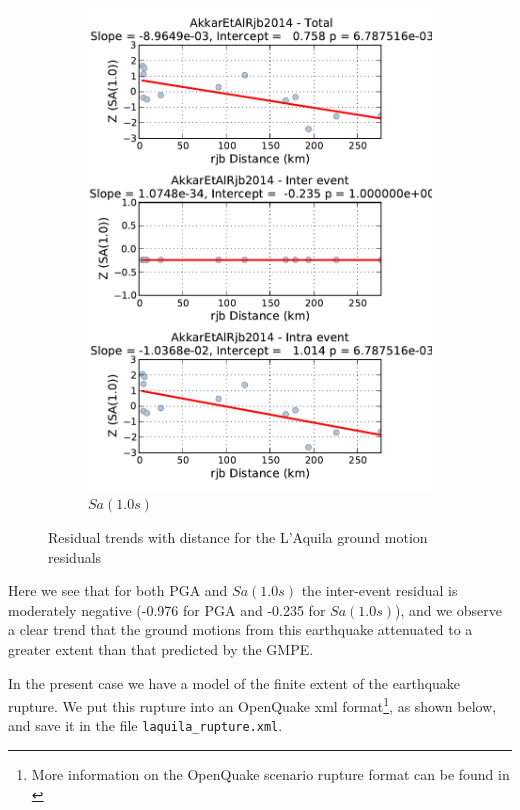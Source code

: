 \begin{figure}[htb]
\begin{subfigure}[b]{0.49\textwidth}
      \includegraphics[width=\textwidth]{./figures/hazard/LAquila_Residuals_with_distance_sa1.pdf}
      \caption{$Sa \left( {1.0 s} \right)$ }
      \label{fig:laquila_resid_sa1}
  \end{subfigure}
  \caption{Residual trends with distance for the L'Aquila ground motion residuals}
  \label{fig:laquila_resid_distance}
\end{figure}

Here we see that for both PGA and $Sa \left( {1.0 s} \right)$ the inter-event residual is moderately negative (-0.976 for PGA and -0.235 for $Sa \left( {1.0 s} \right)$), and we observe a clear trend that the ground motions from this earthquake attenuated to a greater extent than that predicted by the GMPE. 

In the present case we have a model of the finite extent of the earthquake rupture. We put this rupture into an OpenQuake xml format\footnote{More information on the OpenQuake scenario rupture format can be found in \cite{crowley2013}}, as shown below, and save it in the file \verb=laquila_rupture.xml=.


